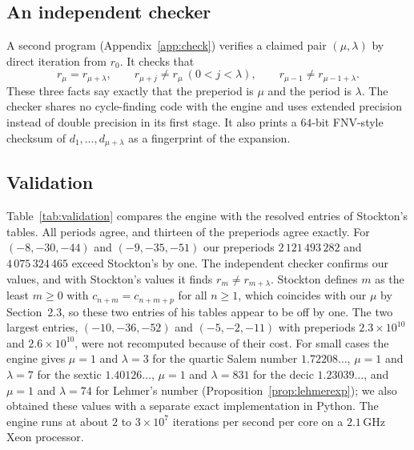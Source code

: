 \documentclass[11pt]{amsart}
\theoremstyle{definition}
\theoremstyle{remark}
\begin{document}
\subsection{An independent checker}
A second program (Appendix~\ref{app:check}) verifies a claimed pair $(\mu,\lambda)$ by direct iteration from $r_0$. It checks that
\[
r_\mu=r_{\mu+\lambda},\qquad r_{\mu+j}\neq r_\mu\ (0<j<\lambda),\qquad r_{\mu-1}\neq r_{\mu-1+\lambda}.
\]
These three facts say exactly that the preperiod is $\mu$ and the period is $\lambda$. The checker shares no cycle-finding code with the engine and uses extended precision instead of double precision in its first stage. It also prints a $64$-bit FNV-style checksum of $d_1,\dots,d_{\mu+\lambda}$ as a fingerprint of the expansion.

\subsection{Validation}
Table~\ref{tab:validation} compares the engine with the resolved entries of Stockton's tables. All periods agree, and thirteen of the preperiods agree exactly. For $(-8,-30,-44)$ and $(-9,-35,-51)$ our preperiods $2\,121\,493\,282$ and $4\,075\,324\,465$ exceed Stockton's by one. The independent checker confirms our values, and with Stockton's values it finds $r_m\neq r_{m+\lambda}$. Stockton defines $m$ as the least $m\ge0$ with $c_{n+m}=c_{n+m+p}$ for all $n\ge1$, which coincides with our $\mu$ by Section~2.3, so these two entries of his tables appear to be off by one. The two largest entries, $(-10,-36,-52)$ and $(-5,-2,-11)$ with preperiods $2.3\times10^{10}$ and $2.6\times10^{10}$, were not recomputed because of their cost. For small cases the engine gives $\mu=1$ and $\lambda=3$ for the quartic Salem number $1.72208\ldots$, $\mu=1$ and $\lambda=7$ for the sextic $1.40126\ldots$, $\mu=1$ and $\lambda=831$ for the decic $1.23039\ldots$, and $\mu=1$ and $\lambda=74$ for Lehmer's number (Proposition~\ref{prop:lehmerexp}); we also obtained these values with a separate exact implementation in Python. The engine runs at about $2$ to $3\times10^7$ iterations per second per core on a $2.1$\,GHz Xeon processor.
\end{document}
